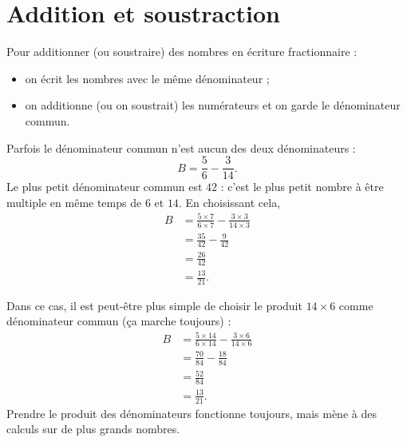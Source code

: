 

\section{Addition et soustraction}



\begin{Aretenir}
    Pour additionner (ou soustraire) des nombres en écriture fractionnaire :
    \begin{itemize}
        \item 
            on écrit les nombres avec le même dénominateur ;
        \item 
            on additionne (ou on soustrait) les numérateurs et on garde le dénominateur commun.
    \end{itemize}
\end{Aretenir}

\begin{example}
    Parfois le dénominateur commun n'est aucun des deux dénominateurs :
    \begin{equation}
        B=\frac{5}{ 6 }-\frac{ 3 }{ 14 }.
    \end{equation}
    Le plus petit dénominateur commun est \( 42\) : c'est le plus petit nombre à être multiple en même temps de \( 6\) et \( 14\). En choisissant cela,
    \begin{subequations}
        \begin{align}
            B&=\frac{ 5\times 7 }{ 6\times 7 }-\frac{ 3\times 3 }{ 14\times 3 }\\
            &=\frac{ 35 }{ 42 }-\frac{ 9 }{ 42 }\\
            &=\frac{ 26 }{ 42 }\\
            &=\frac{ 13 }{ 21 }.
        \end{align}
    \end{subequations}
    
    Dans ce cas, il est peut-être plus simple de choisir le produit \( 14\times 6\) comme dénominateur commun (ça marche toujours) :
    \begin{subequations}
        \begin{align}
            B&=\frac{ 5\times 14 }{ 6\times 14 }-\frac{ 3\times 6 }{ 14\times 6 }\\
            &=\frac{ 70 }{ 84 }-\frac{ 18 }{ 84 }\\
            &=\frac{ 52 }{ 84 }\\
            &=\frac{ 13 }{ 21 }.
        \end{align}
    \end{subequations}
    Prendre le produit des dénominateurs fonctionne toujours, mais mène à des calculs sur de plus grands nombres.    
\end{example}

